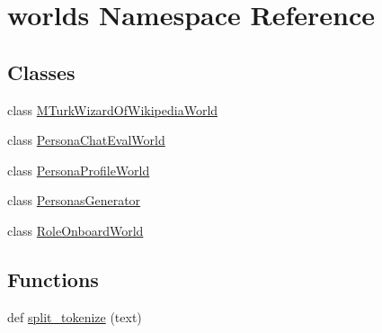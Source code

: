 \hypertarget{namespaceworlds}{}\section{worlds Namespace Reference}
\label{namespaceworlds}
\subsection*{Classes}
\begin{DoxyCompactItemize}
\item 
class \hyperlink{classworlds_1_1MTurkWizardOfWikipediaWorld}{M\+Turk\+Wizard\+Of\+Wikipedia\+World}
\item 
class \hyperlink{classworlds_1_1PersonaChatEvalWorld}{Persona\+Chat\+Eval\+World}
\item 
class \hyperlink{classworlds_1_1PersonaProfileWorld}{Persona\+Profile\+World}
\item 
class \hyperlink{classworlds_1_1PersonasGenerator}{Personas\+Generator}
\item 
class \hyperlink{classworlds_1_1RoleOnboardWorld}{Role\+Onboard\+World}
\end{DoxyCompactItemize}
\subsection*{Functions}
\begin{DoxyCompactItemize}
\item 
def \hyperlink{namespaceworlds_a177b303e39cf751847e7f357c5bcc1ff}{split\+\_\+tokenize} (text)
\end{DoxyCompactItemize}
